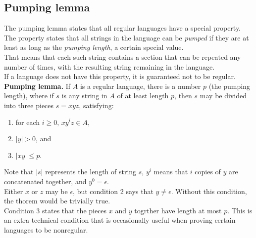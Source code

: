\documentclass{article}
\begin{document}
\subsection{Pumping lemma}
The pumping lemma states that all regular languages have a special property. The property states that all strings in the language can be \textit{pumped} if they are at least as long as the \textit{pumping length}, a certain special value.\medskip
\\That means that each such string contains a section that can be repeated any number of times, with the resulting string remaining in the language.\medskip
\\If a language does not have this property, it is guaranteed not to be regular.\medskip
\\\textbf{Pumping lemma.} If $A$ is a regular language, there is a number $p$ (the pumping length), where if $s$ is any string in $A$ of at least length $p$, then $s$ may be divided into three pieces $s = xyz$, satisfying:
\begin{enumerate}
	\item for each $i \geq 0$, $xy^iz \in A$,
	\item $|y| > 0$, and
	\item $|xy| \leq p$.
\end{enumerate}
Note that $|s|$ represents the length of string $s$, $y^i$ means that $i$ copies of $y$ are concatenated together, and $y^0 = \epsilon$.\medskip
\\Either $x$ or $z$ may be $\epsilon$, but condition 2 says that $y \neq \epsilon$. Without this condition, the thorem would be trivially true.\medskip
\\Condition 3 states that the pieces $x$ and $y$ togrther have length at most $p$. This is an extra technical condition that is occasionally useful when proving certain languages to be nonregular.
\end{document}
